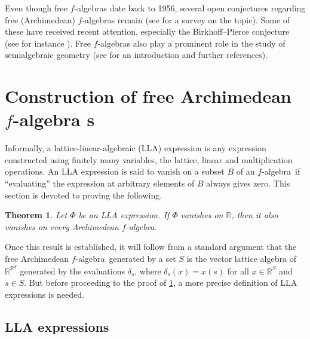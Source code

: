 \documentclass{memo-l}
\newtheorem{thm}[theorem]{Theorem}
\theoremstyle{definition}
\theoremstyle{remark}
\numberwithin{section}{chapter}
\numberwithin{equation}{chapter}
\newcommand\R{\ensuremath{\mathbb{R}}}
\newcommand{\falg}{$f\!$-algebra}
\begin{document}
Even though free \falg s date back to 1956, several
open conjectures regarding free (Archimedean) \falg s remain (see
\cite{keimel1995} for a survey on the topic). Some of these
have received recent attention, especially the Birkhoff--Pierce
conjecture (see for instance
\cite{madden2011,mahe2007,wagner2010,lucas_schaub_spivakovsky2015}).
Free \falg s also play a prominent role in the
study of semialgebraic geometry (see \cite[Section 5]{keimel1995} for
an introduction and further references).

\section{Construction of free Archimedean \falg
s}\label{sec:construction_FAFA}

Informally, a lattice-linear-algebraic (LLA) expression is any
expression constructed using finitely many variables, the lattice,
linear and multiplication operations. An LLA expression is said to vanish
on a subset $B$ of an \falg\ if ``evaluating'' the expression at arbitrary
elements of $B$ always gives zero. This section is devoted to proving
the following.

\begin{thm}\label{thm:falgYudin}
    Let $\Phi $ be an LLA expression. If $\Phi $ vanishes on $\R$,
    then it also vanishes on every Archimedean \falg.
\end{thm}

Once this result is established, it will follow from a standard
argument that the free Archimedean \falg\ generated by a set $S$ is
the vector lattice algebra of $\R^{\R^{S}}$ generated by the
evaluations $\delta _s$, where $\delta _s(x)=x(s)$ for all $x \in
\R^{S}$ and $s \in S$.
But before proceeding to the proof of \cref{thm:falgYudin}, a more
precise definition of LLA expressions is needed.

\subsection{LLA expressions}
\end{document}
